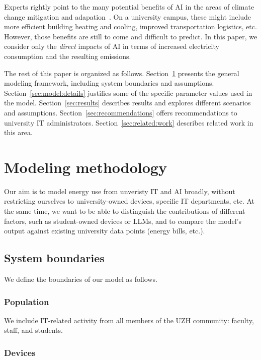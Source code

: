 \documentclass[11pt]{article}
\begin{document}
Experts rightly point to the many potential benefits of AI in the areas of climate change mitigation and adapation~\cite{climate:change:ai}. On a university campus, these might include more efficient building heating and cooling, improved transportation logistics, etc. However, those benefits are still to come and difficult to predict. In this paper, we consider only the {\em direct} impacts of AI in terms of increased electricity consumption and the resulting emissions.

The rest of this paper is organized as follows. Section~\ref{sec:model:methodology} presents the general modeling framework, including system boundaries and assumptions. Section~\ref{sec:model:details} justifies some of the specific parameter values used in the model. Section~\ref{sec:results} describes results and explores different scenarios and assumptions. Section~\ref{sec:recommendations} offers recommendations to university IT administrators. Section~\ref{sec:related:work} describes related work in this area.

\section{Modeling methodology}
\label{sec:model:methodology}

Our aim is to model energy use from unveristy IT and AI broadly, without restricting ourselves to university-owned devices, specific IT departments, etc. At the same time, we want to be able to distinguish the contributions of different factors, such as student-owned devices or LLMs, and to compare the model's output against existing university data points (energy bills, etc.).

\subsection{System boundaries}

We define the boundaries of our model as follows.

\subsubsection*{Population}

We include IT-related activity from all members of the UZH community: faculty, staff, and students.

\subsubsection*{Devices}
\end{document}
